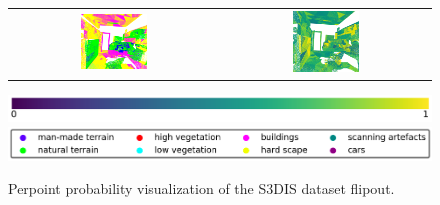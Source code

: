 \begin{figure}[h!]
\begin{tabular}{cc}
            \includegraphics[width=0.33\textwidth, height=0.18\textheight]{images/seg_output/s3dis_DE/office_42.pdf}& 
            \includegraphics[width=0.33\textwidth, height=0.18\textheight]{images/seg_output/s3dis_DE/fout_4.png}\\
        \end{tabular}
        \includegraphics[scale=0.45]{images/prob_legend.pdf}
        \includegraphics[scale=0.45]{images/legend.png}
        \caption{Perpoint probability visualization of the S3DIS dataset flipout.}
        \label{fig:fout_s3dis_probmap}
    \end{figure}

    \FloatBarrier
